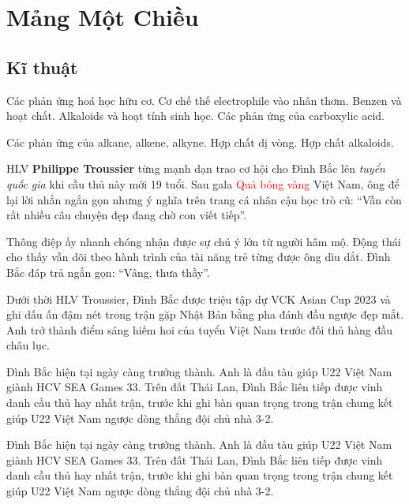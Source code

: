 
\chapter{Mảng Một Chiều}
\hypertarget{localtoc\thechapter}{}
\localtoc

\section{Kĩ thuật}
\begin{keypoints}
    Các phản ứng hoá học hữu cơ. Cơ chế thế electrophile vào nhân thơm. Benzen và hoạt chất. Alkaloids và hoạt tính sinh học. Các phản ứng của carboxylic acid. 
    
    Các phản ứng của alkane, alkene, alkyne. Hợp chất dị vòng. Hợp chất alkaloids.
\end{keypoints}

\noindent HLV \textbf{Philippe Troussier} từng mạnh dạn trao cơ hội cho Đình Bắc lên \textit{tuyển quốc gia} khi cầu thủ này mới 19 tuổi. Sau gala \textcolor{red}{Quả bóng vàng} Việt Nam, ông để lại lời nhắn ngắn gọn nhưng ý nghĩa trên trang cá nhân cậu học trò cũ: \enquote{Vẫn còn rất nhiều câu chuyện đẹp đang chờ con viết tiếp}.

Thông điệp ấy nhanh chóng nhận được sự chú ý lớn từ người hâm mộ. Động thái cho thấy  vẫn dõi theo hành trình của tài năng trẻ từng được ông dìu dắt. Đình Bắc đáp trả ngắn gọn: \enquote{Vâng, thưa thầy}.

Dưới thời HLV Troussier, Đình Bắc được triệu tập dự VCK Asian Cup 2023 và ghi dấu ấn đậm nét trong trận gặp Nhật Bản bằng pha đánh đầu ngược đẹp mắt. Anh trở thành điểm sáng hiếm hoi của tuyển Việt Nam trước đối thủ hàng đầu châu lục.

Đình Bắc hiện tại ngày càng trưởng thành. Anh là đầu tàu giúp U22 Việt Nam giành HCV SEA Games 33. Trên đất Thái Lan, Đình Bắc liên tiếp được vinh danh cầu thủ hay nhất trận, trước khi ghi bàn quan trọng trong trận chung kết giúp U22 Việt Nam ngược dòng thắng đội chủ nhà 3-2.


Đình Bắc hiện  tại ngày càng trưởng thành. Anh là đầu tàu giúp U22 Việt Nam giành HCV SEA Games 33. Trên đất Thái Lan, Đình Bắc liên tiếp được vinh danh cầu thủ hay nhất trận, trước khi ghi bàn quan trọng trong trận chung kết giúp U22 Việt Nam ngược dòng thắng đội chủ nhà 3-2. 

